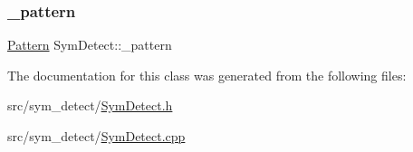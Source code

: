 \mbox{\label{classSymDetect_a77937a3591871874553ea30e7d78fc2e}} 
\subsubsection{\texorpdfstring{\+\_\+pattern}{\_pattern}}
{\footnotesize\ttfamily \hyperlink{classPattern}{Pattern} Sym\+Detect\+::\+\_\+pattern\hspace{0.3cm}{\ttfamily [private]}}



The documentation for this class was generated from the following files\+:\begin{DoxyCompactItemize}
\item 
src/sym\+\_\+detect/\hyperlink{SymDetect_8h}{Sym\+Detect.\+h}\item 
src/sym\+\_\+detect/\hyperlink{SymDetect_8cpp}{Sym\+Detect.\+cpp}\end{DoxyCompactItemize}

